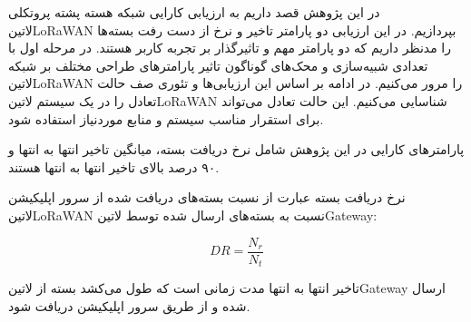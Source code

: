 
در این پژوهش قصد داریم به ارزیابی کارایی شبکه هسته پشته پروتکلی ‌لاتین{LoRaWAN}
بپردازیم. در این ارزیابی دو پارامتر تاخیر و نرخ از دست رفت بسته‌ها را مدنظر داریم که دو پارامتر مهم
و تاثیرگذار بر تجربه کاربر هستند.
در مرحله اول با تعدادی شبیه‌سازی و محک‌های گوناگون تاثیر پارامترهای طراحی مختلف بر شبکه ‌لاتین{LoRaWAN}
را مرور می‌کنیم.
در ادامه بر اساس این ارزیابی‌ها و تئوری صف حالت تعادل را در یک سیستم ‌لاتین{LoRaWAN} شناسایی می‌کنیم.
این حالت تعادل می‌تواند برای استقرار مناسب سیستم و منابع موردنیاز استفاده شود.

پارامترهای کارایی در این پژوهش شامل نرخ دریافت بسته، میانگین تاخیر انتها به انتها و ۹۰ درصد بالای تاخیر انتها به انتها
هستند.

نرخ دریافت بسته عبارت از نسبت بسته‌های دریافت شده از سرور اپلیکیشن ‌لاتین{LoRaWAN}
نسبت به بسته‌های ارسال شده توسط ‌لاتین{Gateway}:

\[
  DR = \frac{N_{r}}{N_{t}}
\]

تاخیر انتها به انتها مدت زمانی است که طول می‌کشد بسته از ‌لاتین{Gateway} ارسال شده
و از طریق سرور اپلیکیشن دریافت شود.
